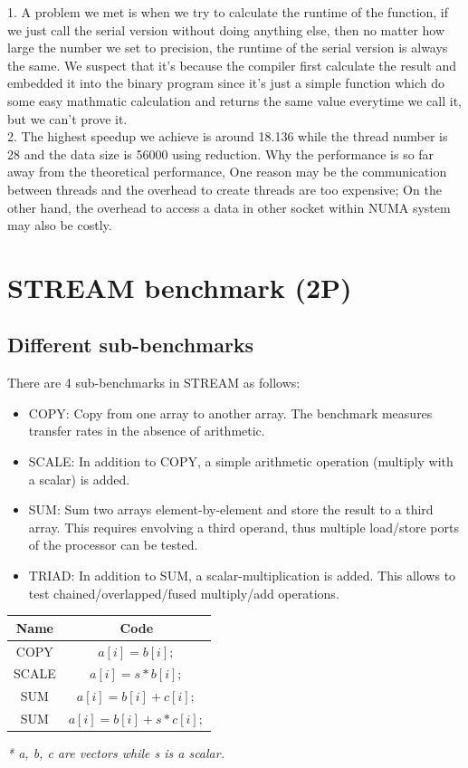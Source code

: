 \documentclass[article]{scrartcl}
\begin{document}
1. A problem we met is when we try to calculate the runtime of the function, if we just call the serial version without doing anything else,
then no matter how large the number we set to precision, the runtime of the serial version is always the same. We suspect that it's because the compiler
first calculate the result and embedded it into the binary program since it's just a simple function which do some easy mathmatic calculation and returns the same value everytime we call it, but we can't prove it.\\

2. The highest speedup we achieve is around 18.136 while the thread number is 28 and the data size is 56000 using reduction. Why the performance is so far away from the theoretical performance,
One reason may be the communication between threads and the overhead to create threads are too expensive; On the other hand, the overhead to access a data in other socket within NUMA system may also be costly.
\section{STREAM benchmark (2P)}
\subsection{Different sub-benchmarks}
There are 4 sub-benchmarks in STREAM \cite{stream01} as follows:
\begin{itemize}
  \item COPY: Copy from one array to another array. The benchmark measures transfer rates in the absence of arithmetic.
  \item SCALE: In addition to COPY, a simple arithmetic operation (multiply with a scalar) is added.
  \item SUM: Sum two arrays element-by-element and store the result to a third array. This requires envolving a third operand, thus multiple load/store ports of the processor can be tested.
  \item TRIAD: In addition to SUM, a scalar-multiplication is added. This allows to test chained/overlapped/fused multiply/add operations.
\end{itemize}

\begin{center}
  \begin{tabular}{ c|c } 
    Name & Code \\
    \hline
    COPY & $a[i] = b[i];$ \\
    SCALE & $a[i] = s*b[i];$ \\
    SUM & $a[i] = b[i]+c[i];$ \\
    SUM & $a[i] = b[i]+s*c[i];$ \\
  \end{tabular}
\end{center}
\textit{* a, b, c are vectors while s is a scalar.} \\
\end{document}

